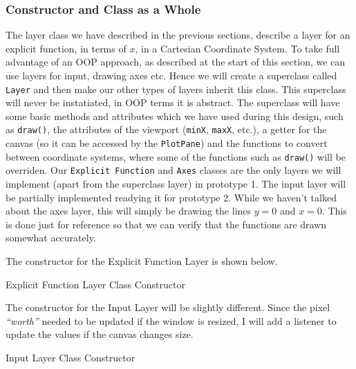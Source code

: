 \documentclass[../../../../../../main.tex]{subfiles}
\begin{document}
\subsubsection{Constructor and Class as a Whole}
The layer class we have described in the previous sections, describe a layer for an explicit function, in terms of $x$, in a Cartesian Coordinate System. To take full advantage of an OOP approach, as described at the start of this section, we can use layers for input, drawing axes etc. Hence we will create a superclass called \texttt{Layer} and then make our other types of layers inherit this class. This superclass will never be instatiated, in OOP terms it is abstract. The superclass will have some basic methods and attributes which we have used during this design, such as \texttt{draw()}, the attributes of the viewport (\texttt{minX}, \texttt{maxX}, etc.), a getter for the canvas (so it can be accessed by the \texttt{PlotPane}) and the functions to convert between coordinate systems, where some of the functions such as \texttt{draw()} will be overriden. Our \texttt{Explicit Function} and \texttt{Axes} classes are the only layers we will implement (apart from the superclass layer) in prototype 1. The input layer will be partially implemented readying it for prototype 2. While we haven't talked about the axes layer, this will simply be drawing the lines $y=0$ and $x=0$. This is done just for reference so that we can verify that the functions are drawn somewhat accurately.

The constructor for the Explicit Function Layer is shown below.

\begin{algorithm}[H]
\DontPrintSemicolon
\caption{Explicit Function Layer Class Constructor}
\label{alg:funcLayerConstructor}
\end{algorithm}

The constructor for the Input Layer will be slightly different. Since the pixel \textit{``worth''} needed to be updated if the window is resized, I will add a listener to update the values if the canvas changes size.

\begin{algorithm}[H]
\DontPrintSemicolon
\caption{Input Layer Class Constructor}
\label{alg:inpLayerConstructor}
\end{algorithm}
\end{document}

